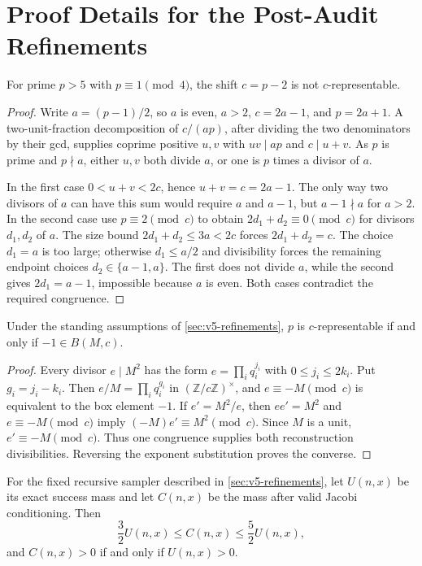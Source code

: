 \section{Proof Details for the Post-Audit Refinements}\label{app:v5-proofs}

\begin{proposition}[The shift $c=p-2$ is empty]
For prime $p>5$ with $p\equiv1\pmod4$, the shift $c=p-2$ is not
$c$-representable.
\end{proposition}

\begin{proof}
Write $a=(p-1)/2$, so $a$ is even, $a>2$, $c=2a-1$, and $p=2a+1$.
A two-unit-fraction decomposition of $c/(ap)$, after dividing the two
denominators by their gcd, supplies coprime positive $u,v$ with $uv\mid ap$
and $c\mid u+v$.  As $p$ is prime and $p\nmid a$, either $u,v$ both divide
$a$, or one is $p$ times a divisor of $a$.

In the first case $0<u+v<2c$, hence $u+v=c=2a-1$.  The only way two divisors
of $a$ can have this sum would require $a$ and $a-1$, but $a-1\nmid a$ for
$a>2$.  In the second case use $p\equiv2\pmod c$ to obtain
$2d_1+d_2\equiv0\pmod c$ for divisors $d_1,d_2$ of $a$.  The size bound
$2d_1+d_2\le3a<2c$ forces $2d_1+d_2=c$.  The choice $d_1=a$ is too large;
otherwise $d_1\le a/2$ and divisibility forces the remaining endpoint choices
$d_2\in\{a-1,a\}$.  The first does not divide $a$, while the second gives
$2d_1=a-1$, impossible because $a$ is even.  Both cases contradict the
required congruence.
\end{proof}

\begin{theorem}
Under the standing assumptions of \cref{sec:v5-refinements}, $p$ is
$c$-representable if and only if $-1\in B(M,c)$.
\end{theorem}

\begin{proof}
Every divisor $e\mid M^2$ has the form $e=\prod_i q_i^{j_i}$ with
$0\le j_i\le2k_i$.  Put $g_i=j_i-k_i$.  Then
$e/M=\prod_i q_i^{g_i}$ in $(\mathbb Z/c\mathbb Z)^\times$, and
$e\equiv-M\pmod c$ is equivalent to the box element $-1$.  If
$e'=M^2/e$, then $ee'=M^2$ and $e\equiv-M\pmod c$ imply
$(-M)e'\equiv M^2\pmod c$.  Since $M$ is a unit, $e'\equiv-M\pmod c$.
Thus one congruence supplies both reconstruction divisibilities.  Reversing
the exponent substitution proves the converse.
\end{proof}

\begin{theorem}
For the fixed recursive sampler described in \cref{sec:v5-refinements}, let
$U(n,x)$ be its exact success mass and let $C(n,x)$ be the mass after valid
Jacobi conditioning.  Then
\[
  \frac32U(n,x)\le C(n,x)\le\frac52U(n,x),
\]
and $C(n,x)>0$ if and only if $U(n,x)>0$.
\end{theorem}

